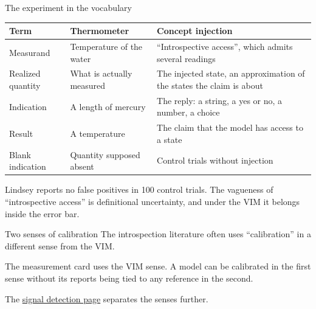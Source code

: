 \documentclass[aspectratio=169,11pt]{beamer}
\begin{document}
\begin{frame}[label=mapping]{The experiment in the vocabulary}
\begin{center}
{\footnotesize\renewcommand{\arraystretch}{1.1}
\begin{tabular}{L{2.4cm}L{3.6cm}L{6.4cm}}
\toprule
\textbf{Term} & \textbf{Thermometer} & \textbf{Concept injection} \\
\midrule
Measurand & Temperature of the water & ``Introspective access'', which admits several readings \\
Realized quantity & What is actually measured & The injected state, an approximation of the states the claim is about \\
Indication & A length of mercury & The reply: a string, a yes or no, a number, a choice \\
Result & A temperature & The claim that the model has access to a state \\
Blank indication & Quantity supposed absent & Control trials without injection \\
\bottomrule
\end{tabular}}
\end{center}

\vspace{0.4em}
{\small Lindsey reports no false positives in 100 control trials. The vagueness of ``introspective access'' is definitional uncertainty, and under the VIM it belongs inside the error bar.}
\end{frame}

\begin{frame}[label=twosenses]{Two senses of calibration}
The introspection literature often uses ``calibration'' in a different sense from the VIM.

\vspace{0.5em}
\begin{center}
\end{center}

\vspace{0.5em}
The measurement card uses the VIM sense. A model can be calibrated in the first sense without its reports being tied to any reference in the second.

\vspace{0.3em}
{\small The \href{https://measuring-self-reports.github.io/measuring-self-reports/foundations/signal-detection/}{signal detection page} separates the senses further.}
\end{frame}
\end{document}
